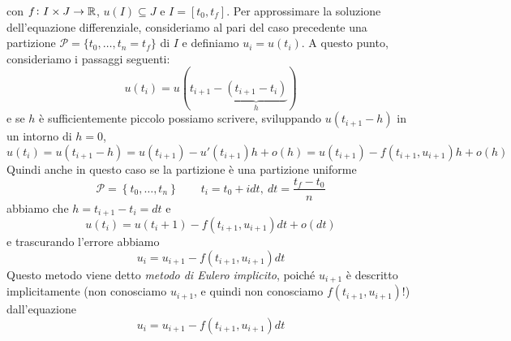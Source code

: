 con $f\colon I \times J \to \amsbb{R}$, $u(I)\subseteq J$ e $I=[t_0, t_f]$. Per approssimare la soluzione dell'equazione differenziale, consideriamo al pari del caso precedente una partizione $\mathscr{P} = \{t_0, \dots, t_n = t_f\}$ di $I$ e definiamo $u_i = u(t_i)$. A questo punto, consideriamo i passaggi seguenti:
\[
u(t_i) = u(t_{i+1} - \underbrace{(t_{i+1}-t_{i})}_{h})
\]
e se $h$ è sufficientemente piccolo possiamo scrivere, sviluppando $u(t_{i+1}-h)$ in un intorno di $h=0$,
\[
u(t_i) = u(t_{i+1}-h) = u(t_{i+1})-u'(t_{i+1})h +o(h) = u(t_{i+1})-f(t_{i+1}, u_{i+1})h+o(h)
\]
Quindi anche in questo caso se la partizione è una partizione uniforme
\[
\mathscr{P} = \left\{t_0, \dots, t_n\right\} \qquad t_i = t_0+idt, \ dt =\frac{t_f-t_0}{n}
\]
abbiamo che $h=t_{i+1}-t_i = dt$ e 
\[
u(t_i) = u(t_i+1)-f(t_{i+1}, u_{i+1})dt +o(dt)
\]
e trascurando l'errore abbiamo
\begin{equation}
    \label{eq:12.2}
    u_i = u_{i+1}-f(t_{i+1}, u_{i+1})dt
\end{equation}
Questo metodo viene detto \emph{metodo di Eulero implicito}, poiché $u_{i+1}$ è descritto implicitamente (non conosciamo $u_{i+1}$, e quindi non conosciamo $f(t_{i+1}, u_{i+1})$!) dall'equazione
\[
u_i = u_{i+1}-f(t_{i+1}, u_{i+1})dt
\]
